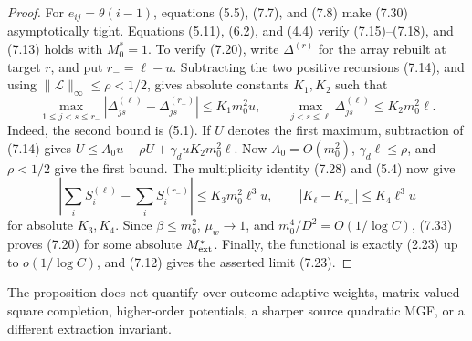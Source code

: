 \begin{proof}
For \(e_{ij}=\theta(i-1)\), equations (5.5), (7.7), and (7.8) make
(7.30) asymptotically tight.  Equations (5.11), (6.2), and (4.4) verify
(7.15)--(7.18), and (7.13) holds with \(M_0^*=1\).  To verify (7.20), write
\(\Delta^{(r)}\) for the array rebuilt at target \(r\), and put
\(r_-=\ell-u\).  Subtracting the two positive recursions (7.14), and using
\(\|\mathcal L\|_{\infty}\le\rho<1/2\), gives absolute constants
\(K_1,K_2\) such that
\[
 \max_{1\le j<s\le r_-}
 \left|\Delta_{js}^{(\ell)}-\Delta_{js}^{(r_-)}\right|
 \le K_1m_0^2u,
 \qquad
 \max_{j<s\le\ell}\Delta_{js}^{(\ell)}\le K_2m_0^2\ell.
\tag{7.32}
\]
Indeed, the second bound is (5.1).  If \(U\) denotes the first maximum,
subtraction of (7.14) gives
\(U\le A_0u+\rho U+\gamma_duK_2m_0^2\ell\).  Now
\(A_0=O(m_0^2)\), \(\gamma_d\ell\le\rho\), and \(\rho<1/2\) give the first
bound.  The multiplicity identity (7.28) and (5.4) now give
\[
 \left|\sum_iS_i^{(\ell)}-\sum_iS_i^{(r_-)}\right|
 \le K_3m_0^2\ell^3u,
 \qquad |K_\ell-K_{r_-}|\le K_4\ell^3u
\tag{7.33}
\]
for absolute \(K_3,K_4\).  Since \(\beta\le m_0^2\), \(\mu_w\to1\), and
\(m_0^4/D^2=O(1/\log C)\), (7.33) proves (7.20) for some absolute
\(M_{\rm ext}^*\).  Finally, the functional is exactly (2.23) up to
\(o(1/\log C)\), and (7.12) gives the asserted limit (7.23).
\end{proof}

The proposition does not quantify over outcome-adaptive weights,
matrix-valued square completion, higher-order potentials, a sharper source
quadratic MGF, or a different extraction invariant.
